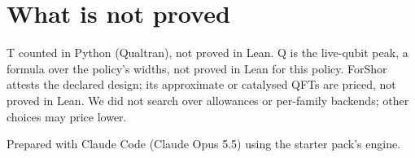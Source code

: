 \documentclass[11pt]{article}
\begin{document}
\section*{What is not proved}
T counted in Python (Qualtran), not proved in Lean.
Q is the live-qubit peak, a formula over the policy's widths, not proved in Lean for this policy.
ForShor attests the declared design; its approximate or catalysed QFTs are priced, not proved in Lean.
We did not search over allowances or per-family backends; other choices may price lower.

Prepared with Claude Code (Claude Opus 5.5) using the starter pack's engine.
\end{document}
